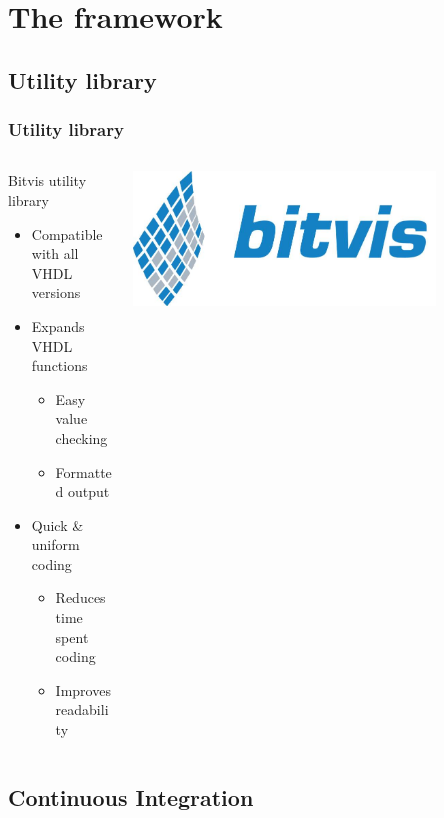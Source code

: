 \documentclass[british,10pt]{beamer}
\begin{document}

\section{The framework}

\subsection{Utility library}

\begin{frame}\frametitle{Utility library}
\begin{columns}
\begin{column}{0.6\textwidth}
Bitvis utility library
\begin{itemize}
\item Compatible with all VHDL versions
\item Expands VHDL functions
\begin{itemize}
\item Easy value checking
\item Formatted output
\end{itemize}
\item Quick \& uniform coding
\begin{itemize}
\item Reduces time spent coding
\item Improves readability
\end{itemize}
\end{itemize}
\end{column}
\includegraphics[width=0.8\textwidth]{images/bitvis.png}
\end{columns}
\end{frame}

\subsection{Continuous Integration}
\end{document}
